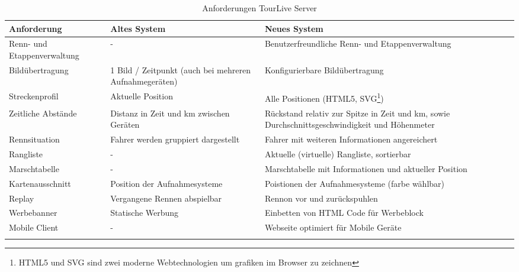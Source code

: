 \begin{longtable}{  p{3.5cm} | p{4.3cm} | p{4.3cm} }
    \textbf{Anforderung} & \textbf{Altes System} & \textbf{Neues System} \\
    \hline\hline
Renn- und Etappenverwaltung & - & Benutzerfreundliche Renn- und Etappenverwaltung
\\ \hline
Bildübertragung & 1 Bild / Zeitpunkt (auch bei mehreren Aufnahmegeräten) & Konfigurierbare Bildübertragung  
    \\ \hline
Streckenprofil & Aktuelle Position & Alle Positionen (HTML5, SVG\footnote{HTML5 und SVG sind zwei moderne Webtechnologien um grafiken im Browser zu zeichnen})
	\\ \hline
	Zeitliche Abstände & Distanz in Zeit und km zwischen Geräten & Rückstand relativ zur Spitze in Zeit und km, sowie Durchschnittsgeschwindigkeit und Höhenmeter
	\\ \hline
Rennsituation & Fahrer werden gruppiert dargestellt & Fahrer mit weiteren Informationen angereichert
	\\ \hline
Rangliste & - & Aktuelle (virtuelle) Rangliste, sortierbar
	\\ \hline
Marschtabelle & - & Marschtabelle mit Informationen und aktueller Position
	\\ \hline
Kartenausschnitt & Position der Aufnahmesysteme & Poistionen der Aufnahmesysteme (farbe wählbar)
	\\ \hline
Replay & Vergangene Rennen abspielbar & Rennon vor und zurückspuhlen
	\\ \hline
Werbebanner & Statische Werbung & Einbetten von HTML Code für Werbeblock
	\\ \hline
Mobile Client & - & Webseite optimiert für Mobile Geräte
	\\ \hline

\caption{Anforderungen TourLive Server}
\end{longtable}

